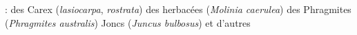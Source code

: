  : des Carex (\textit{lasiocarpa}, \textit{rostrata}) des herbacées (\textit{Molinia caerulea}) des Phragmites (\textit{Phragmites australis}) Joncs (\textit{Juncus bulbosus}) et d'autres \citep{rydin2013dolip}



